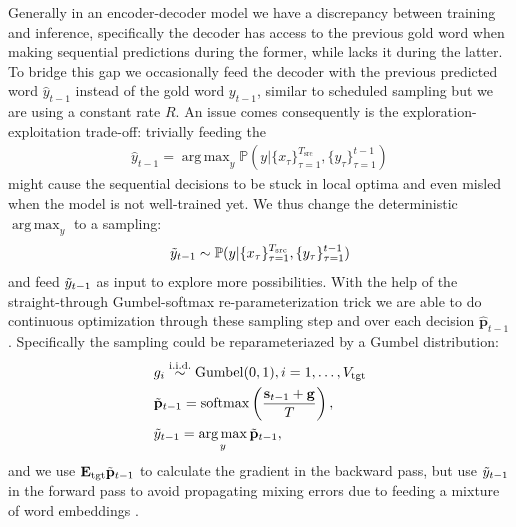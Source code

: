 \documentclass[11pt,a4paper]{article}
\DeclareMathOperator*{\argmax}{arg\,max}
\begin{document}
Generally in an encoder-decoder model
we have a discrepancy between training and inference, specifically the decoder has access to the previous gold word when making sequential predictions during the former, while lacks it during the latter. To bridge this gap we occasionally feed the decoder with the previous predicted word $\hat{y}_{t-1}$ instead of the gold word $y_{t-1}$, similar to scheduled sampling \cite{bengio2015scheduled} but we are using a constant rate $R$. An issue comes consequently is the exploration-exploitation trade-off: trivially feeding the
\begin{align}
    \hat{y}_{t-1}=\argmax_y\mathbb{P}(y|\{x_\tau\}_{\tau=1}^{T_\text{src}},\{y_\tau\}_{\tau=1}^{t-1})
\end{align}
might cause the sequential decisions to be stuck in local optima and even misled when the model is not well-trained yet. We thus change the deterministic $\argmax_y$ to a sampling:
\begin{align}
    \Tilde{y}_{t-1}\sim \mathbb{P}(y|\{x_\tau\}_{\tau=1}^{T_\text{src}},\{y_\tau\}_{\tau=1}^{t-1})
\end{align}
and feed $\Tilde{y}_{t-1}$ as input to explore more possibilities. With the help of the straight-through Gumbel-softmax re-parameterization trick \cite{jang2016categorical} we are able to do continuous optimization through these sampling step and over each decision $\hat{\mathbf{p}}_{t-1}$. Specifically the sampling could be reparameteriazed by a Gumbel distribution:
\begin{align}
    &g_i\overset{\text{i.i.d.}}{\sim}\mathrm{Gumbel}(0,1), i = 1,\dots,V_\text{tgt} \\
    &\Tilde{\mathbf{p}}_{t-1} = \mathrm{softmax}\left(\frac{\mathbf{s}_{t-1}+\mathbf{g}}{T}\right), \\
    &\Tilde{y}_{t-1} = \argmax_y \Tilde{\mathbf{p}}_{t-1},
\end{align}
and we use $\mathbf{E}_\text{tgt}\Tilde{\mathbf{p}}_{t-1}$ to calculate the gradient in the backward pass, but use $\Tilde{y}_{t-1}$ in the forward pass to avoid propagating mixing errors due to feeding a mixture of word embeddings \cite{gu2018neural}.
\end{document}
